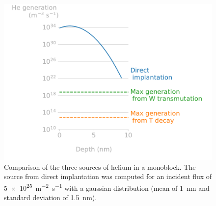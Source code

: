 \begin{figure}
    \centering
    \includegraphics[width=\linewidth]{Figures/Chapter5/helium_generation.pdf}
    \caption{Comparison of the three sources of helium in a \gls{monoblock}. The source from direct implantation was computed for an incident flux of \SI{5e25}{m^{-2}.s^{-1}} with a gaussian distribution (mean of \SI{1}{nm} and standard deviation of \SI{1.5}{nm}).}
\end{figure}